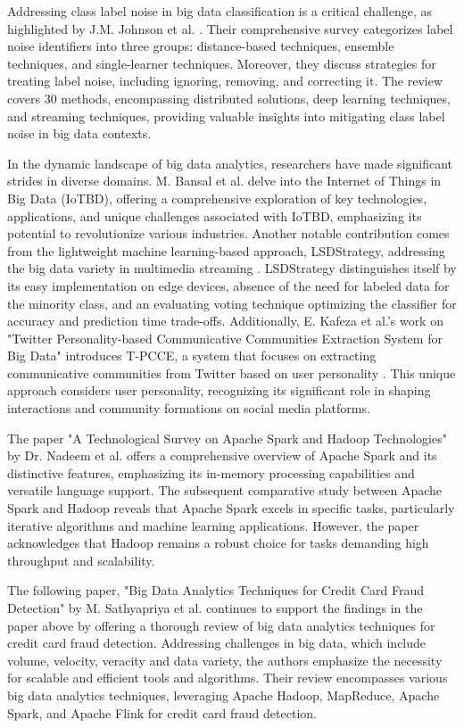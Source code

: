 \documentclass[journal]{IEEEtran}
\begin{document}
Addressing class label noise in big data classification is a critical challenge, as highlighted by J.M. Johnson et al. \cite{LNoise}. Their comprehensive survey categorizes label noise identifiers into three groups: distance-based techniques, ensemble techniques, and single-learner techniques. Moreover, they discuss strategies for treating label noise, including ignoring, removing, and correcting it. The review covers 30 methods, encompassing distributed solutions, deep learning techniques, and streaming techniques, providing valuable insights into mitigating class label noise in big data contexts.

In the dynamic landscape of big data analytics, researchers have made significant strides in diverse domains. M. Bansal et al. \cite{iot} delve into the Internet of Things in Big Data (IoTBD), offering a comprehensive exploration of key technologies, applications, and unique challenges associated with IoTBD, emphasizing its potential to revolutionize various industries. Another notable contribution comes from the lightweight machine learning-based approach, LSDStrategy, addressing the big data variety in multimedia streaming \cite{LSD}. LSDStrategy distinguishes itself by its easy implementation on edge devices, absence of the need for labeled data for the minority class, and an evaluating voting technique optimizing the classifier for accuracy and prediction time trade-offs. Additionally, E. Kafeza et al.'s work on "Twitter Personality-based Communicative Communities Extraction System for Big Data" introduces T-PCCE, a system that focuses on extracting communicative communities from Twitter based on user personality \cite{twitter}. This unique approach considers user personality, recognizing its significant role in shaping interactions and community formations on social media platforms. 

The paper "A Technological Survey on Apache Spark and Hadoop Technologies" by Dr. Nadeem et al. \cite{spark}offers a comprehensive overview of Apache Spark and its distinctive features, emphasizing its in-memory processing capabilities and versatile language support. The subsequent comparative study between Apache Spark and Hadoop reveals that Apache Spark excels in specific tasks, particularly iterative algorithms and machine learning applications. However, the paper acknowledges that Hadoop remains a robust choice for tasks demanding high throughput and scalability.

The following paper, "Big Data Analytics Techniques for Credit Card Fraud Detection" by M. Sathyapriya et al. \cite{CreditCard} continues to support the findings in the paper above \cite{spark} by offering a thorough review of big data analytics techniques for credit card fraud detection. Addressing challenges in big data, which include volume, velocity, veracity and data variety, the authors emphasize the necessity for scalable and efficient tools and algorithms. Their review encompasses various big data analytics techniques, leveraging Apache Hadoop, MapReduce, Apache Spark, and Apache Flink for credit card fraud detection. 
\end{document}
